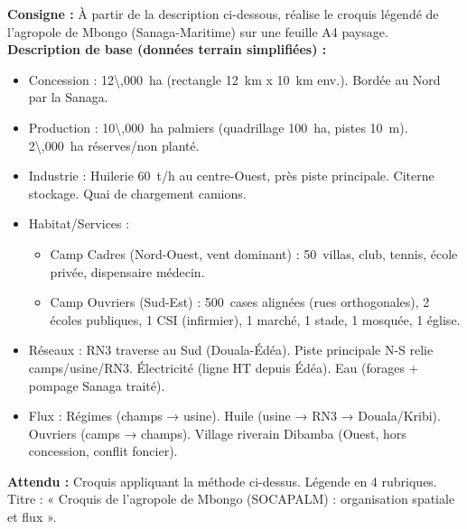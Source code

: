 \documentclass[11pt]{article}
\begin{document}
\begin{experience}
\textbf{Consigne :} À partir de la description ci-dessous, réalise le croquis légendé de l'agropole de Mbongo (Sanaga-Maritime) sur une feuille A4 paysage.
\textbf{Description de base (données terrain simplifiées) :}
\begin{itemize}
    \item Concession : \SI{12\,000}{ha} (rectangle \SI{12}{km} x \SI{10}{km} env.). Bordée au Nord par la Sanaga.
    \item Production : \SI{10\,000}{ha} palmiers (quadrillage \SI{100}{ha}, pistes \SI{10}{m}). \SI{2\,000}{ha} réserves/non planté.
    \item Industrie : Huilerie \SI{60}{t/h} au centre-Ouest, près piste principale. Citerne stockage. Quai de chargement camions.
    \item Habitat/Services :
        \begin{itemize}
            \item Camp Cadres (Nord-Ouest, vent dominant) : \SI{50}{villas}, club, tennis, école privée, dispensaire médecin.
            \item Camp Ouvriers (Sud-Est) : \SI{500}{cases} alignées (rues orthogonales), 2 écoles publiques, 1 CSI (infirmier), 1 marché, 1 stade, 1 mosquée, 1 église.
        \end{itemize}
    \item Réseaux : RN3 traverse au Sud (Douala-Édéa). Piste principale N-S relie camps/usine/RN3. Électricité (ligne HT depuis Édéa). Eau (forages + pompage Sanaga traité).
    \item Flux : Régimes (champs → usine). Huile (usine → RN3 → Douala/Kribi). Ouvriers (camps → champs). Village riverain Dibamba (Ouest, hors concession, conflit foncier).
\end{itemize}
\textbf{Attendu :} Croquis appliquant la méthode ci-dessus. Légende en 4 rubriques. Titre : « Croquis de l'agropole de Mbongo (SOCAPALM) : organisation spatiale et flux ».
\end{experience}
\end{document}
